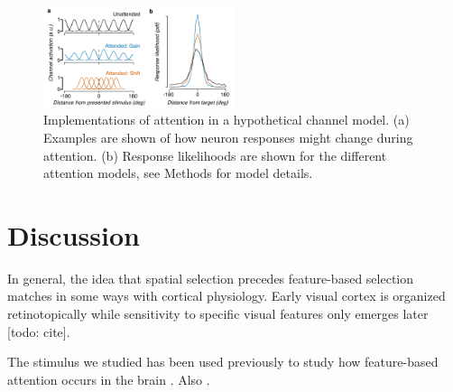 \begin{figure}
\centering
\includegraphics[keepaspectratio,width=0.5\textwidth]{figs_c4/f5_channel_attention.pdf}
\caption[Attention in a channel model]{Implementations of attention in a hypothetical channel model. (a) Examples are shown of how neuron responses might change during attention. (b) Response likelihoods are shown for the different attention models, see Methods for model details.}
\label{fig:c4f7}
\end{figure}

\section{Discussion}

In general, the idea that spatial selection precedes feature-based selection matches in some ways with cortical physiology. Early visual cortex is organized retinotopically \citep{Wandell2007-pr} while sensitivity to specific visual features only emerges later [todo: cite]. 

The stimulus we studied has been used previously to study how feature-based attention occurs in the brain \citep{Saenz2003-qz}. Also \citep{Saenz2002-fs}.